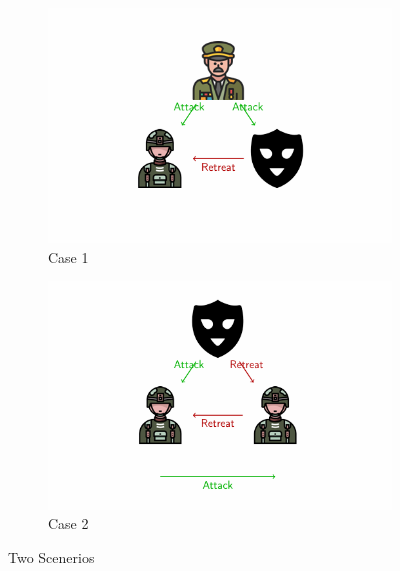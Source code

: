 \documentclass[12pt]{article}
\theoremstyle{remark}
\begin{document}
\begin{figure}[h!]
    \centering
    \begin{subfigure}[b]{0.45\textwidth}
        \centering
        \includegraphics[width=\textwidth]{images/scene1.png}
        \caption{Case 1}
        \label{fig:image1}
    \end{subfigure}
    \hspace{0.5cm}  
    \begin{subfigure}[b]{0.45\textwidth}
        \centering
        \includegraphics[width=\textwidth]{images/scene2.png}
        \caption{Case 2}
        \label{fig:image2}
    \end{subfigure}
    
    \caption{Two Scenerios}
    \label{fig:sidebyside}
\end{figure}

\vspace{2cm}
\end{document}
